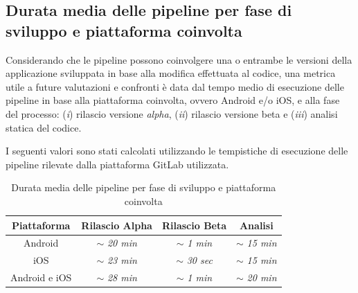 \subsection*{Durata media delle pipeline per fase di sviluppo e piattaforma coinvolta}
Considerando che le pipeline possono coinvolgere una o entrambe le versioni della applicazione sviluppata in base alla modifica effettuata al codice, una metrica utile a future valutazioni e confronti è data dal tempo medio di esecuzione delle pipeline in base alla piattaforma coinvolta, ovvero Android e/o iOS, e alla fase del processo: (\textit{i}) rilascio versione \textit{alpha}, (\textit{ii}) rilascio versione beta e (\textit{iii}) analisi statica del codice.

I seguenti valori sono stati calcolati utilizzando le tempistiche di esecuzione delle pipeline rilevate dalla piattaforma GitLab utilizzata.

\begin{table}[H]
\centering
    \begin{tabular}{|c|c|c|c|}
         \hline
         \textbf{Piattaforma} & \textbf{Rilascio Alpha} & \textbf{Rilascio Beta} & \textbf{Analisi}\\
         \hline
         Android & $\sim$ \textit{20 min} & $\sim$ \textit{1 min} & $\sim$ \textit{15 min} \\
         \hline
         iOS & $\sim$ \textit{23 min} & $\sim$ \textit{30 sec} & $\sim$ \textit{15 min} \\
         \hline
         Android e iOS & $\sim$ \textit{28 min} & $\sim$ \textit{1 min} & $\sim$ \textit{20 min} \\
         \hline
    \end{tabular}
    \caption{Durata media delle pipeline per fase di sviluppo e piattaforma coinvolta}
\end{table}

